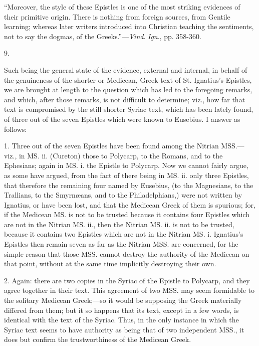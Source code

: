 ``Moreover, the style of these
Epistles is one of the most striking evidences of their primitive
origin. There is nothing from foreign sources, from Gentile learning;
whereas later writers introduced into Christian teaching the
sentiments, not to say the dogmas, of the Greeks.''—\emph{Vind}. \emph{Ign}.,
pp. 358-360.

9.

Such being the general state
of the evidence, external and internal, in behalf of the genuineness
of the shorter or Medicean, Greek text of St. Ignatius's Epistles, we
are brought at length to the question which has led to the foregoing
remarks, and which, after those remarks, is not difficult to
determine; viz., how far that text is compromised by the still shorter
Syriac text, which has been lately found, of three out of the seven
Epistles which were known to Eusebius. I answer as follows:

1. Three out of the seven
Epistles have been found among the Nitrian MSS.—viz., in MS. ii. (Cureton)
those to Polycarp, to the Romans, and to the Ephesians; again in MS. i.
the Epistle to Polycarp. Now we cannot fairly argue, as some have
argued, from the fact of there being in MS. ii. only three Epistles,
that therefore the remaining four named by Eusebius, (to the
Magnesians, to the Trallians, to the Smyrnæans, and to the
Philadelphians,) were not written by Ignatius, or have been lost, and
that the Medicean Greek of them is spurious; for, if the Medicean MS.
is not to be trusted because it contains four Epistles which are not
in the Nitrian MS. ii., then the Nitrian MS. ii. is not to be trusted,
because it contains two Epistles which are not in the Nitrian MS. i.
Ignatius's Epistles then remain seven as far as the Nitrian MSS. are
concerned, for the simple reason that those MSS. cannot destroy the
authority of the Medicean on that point, without at the same time
implicitly destroying their own.

2. Again: there are two copies
in the Syriac of the Epistle to Polycarp, and they agree together in
their text. This agreement of two MSS. may seem formidable to the
solitary Medicean Greek;—so it would be supposing the Greek
materially differed from them; but it so happens that its text, except
in a few words, is identical with the text of the Syriac. Thus, in the
only instance in which the Syriac text seems to have authority as
being that of two independent MSS., it does but confirm the
trustworthiness of the Medicean Greek.

